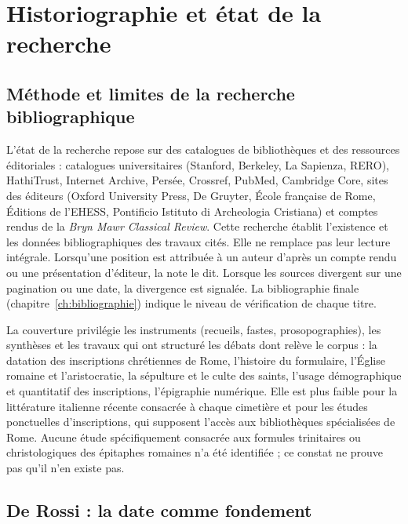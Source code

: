 \chapter{Historiographie et état de la recherche}\label{ch:historiographie}

\section{Méthode et limites de la recherche bibliographique}

L’état de la recherche repose sur des catalogues de bibliothèques et des ressources éditoriales : catalogues universitaires (Stanford, Berkeley, La Sapienza, RERO), HathiTrust, Internet Archive, Persée, Crossref, PubMed, Cambridge Core, sites des éditeurs (Oxford University Press, De Gruyter, École française de Rome, Éditions de l’EHESS, Pontificio Istituto di Archeologia Cristiana) et comptes rendus de la \emph{Bryn Mawr Classical Review}. Cette recherche établit l’existence et les données bibliographiques des travaux cités. Elle ne remplace pas leur lecture intégrale. Lorsqu’une position est attribuée à un auteur d’après un compte rendu ou une présentation d’éditeur, la note le dit. Lorsque les sources divergent sur une pagination ou une date, la divergence est signalée. La bibliographie finale (chapitre~\ref{ch:bibliographie}) indique le niveau de vérification de chaque titre.

La couverture privilégie les instruments (recueils, fastes, prosopographies), les synthèses et les travaux qui ont structuré les débats dont relève le corpus : la datation des inscriptions chrétiennes de Rome, l’histoire du formulaire, l’Église romaine et l’aristocratie, la sépulture et le culte des saints, l’usage démographique et quantitatif des inscriptions, l’épigraphie numérique. Elle est plus faible pour la littérature italienne récente consacrée à chaque cimetière et pour les études ponctuelles d’inscriptions, qui supposent l’accès aux bibliothèques spécialisées de Rome. Aucune étude spécifiquement consacrée aux formules trinitaires ou christologiques des épitaphes romaines n’a été identifiée ; ce constat ne prouve pas qu’il n’en existe pas.

\section{De Rossi : la date comme fondement}


